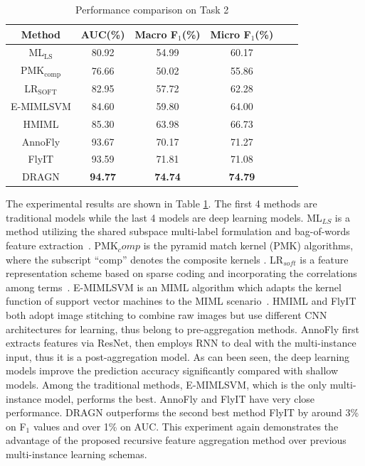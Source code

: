 \documentclass[10pt,twocolumn,letterpaper]{article}
\begin{document}
\begin{table}
\footnotesize
\begin{center}
\begin{tabular}{|c|c|c|c|c|c|}
\hline
Method & AUC(\%) & Macro F$_1$(\%) & Micro F$_1$(\%)\\
\hline\hline
ML$_{\text{LS}}$ & 80.92 & 54.99 & 60.17 \\
PMK$_{\text{comp}}$ & 76.66 & 50.02 & 55.86 \\
LR$_{\text{SOFT}}$ & 82.95 & 57.72 & 62.28 \\
E-MIMLSVM & 84.60 & 59.80 & 64.00 \\
HMIML & 85.30 & 63.98 & 66.73 \\
AnnoFly&93.67&70.17&71.27\\
FlyIT & 93.59 & 71.81 & 71.08 \\ 
DRAGN & \textbf{94.77} & \textbf{74.74} & \textbf{74.79} \\
\hline
\end{tabular}
\end{center}
\caption{Performance comparison on Task 2}\label{tab:task2}
\end{table}

The experimental results are shown in Table \ref{tab:task2}. The first 4 methods are traditional models while the last 4 models are deep learning models. 
ML$_{LS}$ is a method utilizing the shared subspace multi-label formulation and bag-of-words feature extraction~\cite{ji2009bag}. PMK$_comp$ is the pyramid match kernel (PMK) algorithms, where the subscript ``comp'' denotes the composite kernels \cite{ji2009bag}. LR$_{soft}$ is a feature representation scheme based on sparse coding and incorporating the correlations among terms~\cite{ji2009drosophila}. E-MIMLSVM is an MIML algorithm which adapts the kernel function of support vector machines to the MIML scenario~\cite{Li:2012:DGE:2077941.2077950}. HMIML and FlyIT\cite{ref27} both adopt image stitching to combine raw images but use different CNN architectures for learning, thus belong to pre-aggregation methods. AnnoFly \cite{annofly} first extracts features via ResNet, then employs RNN to deal with the multi-instance input, thus it is a post-aggregation model. 
As can been seen, the deep learning models improve the prediction accuracy significantly compared with shallow models. Among the traditional methods,  E-MIMLSVM, which is the only multi-instance model, performs the best. AnnoFly and FlyIT have very close performance. DRAGN outperforms the second best method FlyIT by around 3\% on F$_1$ values and over 1\% on AUC.  This experiment again demonstrates the advantage of the proposed recursive feature aggregation method over previous multi-instance learning schemas.
\end{document}

